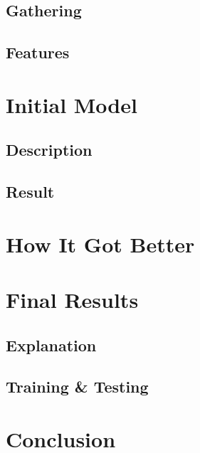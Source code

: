 \documentclass[fleqn,11pt]{article}
\begin{document}
\subsection{ Gathering }

\subsection{ Features }

\section{ Initial Model }

\subsection{ Description }

\subsection{ Result }

\section{ How It Got Better }

\section{ Final Results }

\subsection{ Explanation }

\subsection{ Training \& Testing }

\section{ Conclusion }
\end{document}
